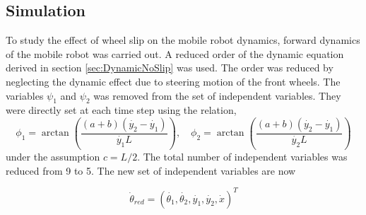 {\subsection{Simulation}
To study the effect of wheel slip on the mobile robot dynamics, forward dynamics of the mobile robot was carried out. 
A reduced order  of the dynamic  equation derived in section \ref{sec:DynamicNoSlip} was used.
 The order was reduced by  neglecting the dynamic effect due to steering motion of the front wheels. The  variables $\psi_1$ and $\psi_2$ was  removed  from the  set of independent variables. They were directly set  at each time step using the relation,
 \[\phi_1=\arctan\left( \frac{(a+b)(\dot{y_2}-\dot{y_1})}{\dot{y_1}L}\right) , \quad
 \phi_2=\arctan\left( \frac{(a+b)(\dot{y_2}-\dot{y_1})}{\dot{y_2}L  }\right) 
 \]
  under the assumption $c=L/2$.
The total number of independent variables  was  reduced from  9 to 5. The new set of independent variables are now

\begin{equation}
\label{eqn:theta_slip_reduced}
\dot{\theta}_{red}=(\dot{\theta_1},\dot{\theta_2}, \dot{y_1},\dot{y_2},\dot{x})^T
\end{equation} 

}
